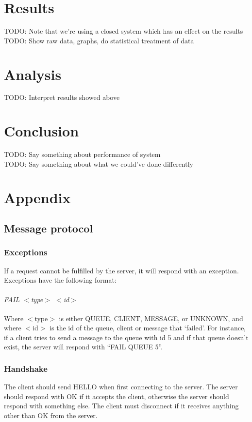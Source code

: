 \documentclass{article}
\begin{document}
    \section{Results}
        TODO: Note that we're using a closed system which has an effect on the results\\
        TODO: Show raw data, graphs, do statistical treatment of data

    \section{Analysis}
        TODO: Interpret results showed above

    \section{Conclusion}
        TODO: Say something about performance of system\\
        TODO: Say something about what we could've done differently
    \section{Appendix}
        \subsection{Message protocol}
            \subsubsection{Exceptions}
                If a request cannot be fulfilled by the server, it will respond with an exception.  Exceptions have the following format:\\
                \\
                \indent\textit{FAIL $<$type$>$ $<$id$>$}\\
                \\
                Where $<$type$>$ is either QUEUE, CLIENT, MESSAGE, or UNKNOWN, and where $<$id$>$ is the id of the queue, client or message that ‘failed’. For instance, if a client tries to send a message to the queue with id 5 and if that queue doesn’t exist, the server will respond with “FAIL QUEUE 5”.

            \subsubsection{Handshake}
                The client should send HELLO when first connecting to the server. The server should respond with OK if it accepts the client, otherwise the server should respond with something else. The client must disconnect if it receives anything other than OK from the server.
\end{document}
